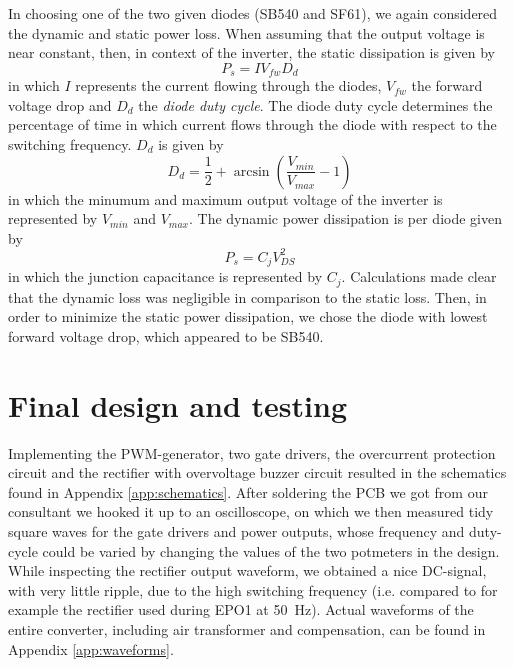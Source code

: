 \documentclass[11pt,titlepage]{report}
\begin{document}
In choosing one of the two given diodes (SB540 and SF61), we again considered the dynamic and static power loss. When assuming that the output voltage is near constant, then, in context of the inverter, the static dissipation is given by
\begin{equation}
	P_s = I V_{fw} D_{d}
\end{equation}
in which $I$ represents the current flowing through the diodes, $V_{fw}$ the forward voltage drop and $D_{d}$ the \textit{diode duty cycle}. The diode duty cycle determines the percentage of time in which current flows through the diode with respect to the switching frequency. $D_{d}$ is given by
\begin{equation}
	D_d = \frac{1}{2}+\arcsin{ \left( \frac{V_{min}}{V_{max}}-1 \right) }
\end{equation}
in which the minumum and maximum output voltage of the inverter is represented by $V_{min}$ and $V_{max}$. The dynamic power dissipation is per diode given by
\begin{equation}
	P_s = C_j V_{DS}^2
\end{equation}
in which the junction capacitance is represented by $C_j$. Calculations made clear that the dynamic loss was negligible in comparison to the static loss. Then, in order to minimize the static power dissipation, we chose the diode with lowest forward voltage drop, which appeared to be SB540. \cite{SB540-datasheet,SF61-datasheet}


\section*{Final design and testing}
Implementing the PWM-generator, two gate drivers, the overcurrent protection circuit and the rectifier with overvoltage buzzer circuit resulted in the schematics found in Appendix \ref{app:schematics}. %
After soldering the PCB we got from our consultant we hooked it up to an oscilloscope, on which we then measured tidy square waves for the gate drivers and power outputs, whose frequency and duty-cycle could be varied by changing the values of the two potmeters in the design. While inspecting the rectifier output waveform, we obtained a nice DC-signal, with very little ripple, due to the high switching frequency (i.e. compared to for example the rectifier used during EPO1 at \SI{50}{Hz}).
Actual waveforms of the entire converter, including air transformer and compensation, can be found in Appendix \ref{app:waveforms}.
\end{document}
